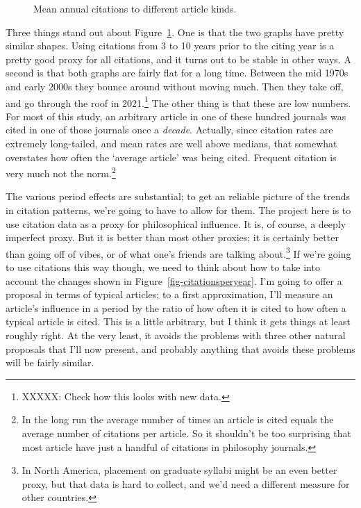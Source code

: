 \documentclass[
  12pt,
  letterpaper,
  DIV=11,
  numbers=noendperiod]{scrartcl}
\begin{document}
\begin{figure}
\begin{minipage}{\linewidth}
{}


\end{minipage}%

\caption{\label{fig-citationrate}Mean annual citations to different
article kinds.}

\end{figure}%

Three things stand out about Figure~\ref{fig-citationrate}. One is that
the two graphs have pretty similar shapes. Using citations from 3 to 10
years prior to the citing year is a pretty good proxy for all citations,
and it turns out to be stable in other ways. A second is that both
graphs are fairly flat for a long time. Between the mid 1970s and early
2000s they bounce around without moving much. Then they take off, and go
through the roof in 2021.\footnote{XXXXX: Check how this looks with new
  data.} The other thing is that these are low numbers. For most of this
study, an arbitrary article in one of these hundred journals was cited
in one of those journals once a \emph{decade}. Actually, since citation
rates are extremely long-tailed, and mean rates are well above medians,
that somewhat overstates how often the `average article' was being
cited. Frequent citation is very much not the norm.\footnote{In the long
  run the average number of times an article is cited equals the average
  number of citations per article. So it shouldn't be too surprising
  that most article have just a handful of citations in philosophy
  journals.}

The various period effects are substantial; to get an reliable picture
of the trends in citation patterns, we're going to have to allow for
them. The project here is to use citation data as a proxy for
philosophical influence. It is, of course, a deeply imperfect proxy. But
it is better than most other proxies; it is certainly better than going
off of vibes, or of what one's friends are talking about.\footnote{In
  North America, placement on graduate syllabi might be an even better
  proxy, but that data is hard to collect, and we'd need a different
  measure for other countries.} If we're going to use citations this way
though, we need to think about how to take into account the changes
shown in Figure~\ref{fig-citationsperyear}. I'm going to offer a
proposal in terms of typical articles; to a first approximation, I'll
measure an article's influence in a period by the ratio of how often it
is cited to how often a typical article is cited. This is a little
arbitrary, but I think it gets things at least roughly right. At the
very least, it avoids the problems with three other natural proposals
that I'll now present, and probably anything that avoids these problems
will be fairly similar.
\end{document}
